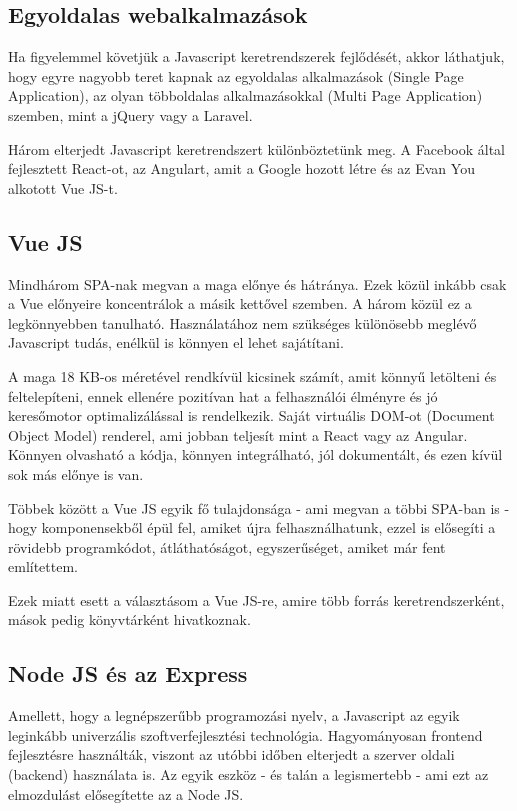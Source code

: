 \subsection{Egyoldalas webalkalmazások}

Ha figyelemmel követjük a Javascript keretrendszerek fejlődését, akkor láthatjuk, hogy egyre nagyobb teret kapnak az egyoldalas alkalmazások (Single Page Application), az olyan többoldalas alkalmazásokkal (Multi Page Application) szemben, mint a jQuery vagy a Laravel.

Három elterjedt Javascript keretrendszert különböztetünk meg. A Facebook által fejlesztett React-ot, az Angulart, amit a Google hozott létre és az Evan You alkotott Vue JS-t.
\cite{vue}

\subsection{Vue JS}

Mindhárom SPA-nak megvan a maga előnye és hátránya. Ezek közül inkább csak a Vue előnyeire koncentrálok a másik kettővel szemben. A három közül ez a legkönnyebben tanulható. Használatához nem szükséges különösebb meglévő Javascript tudás, enélkül is könnyen el lehet sajátítani.

A maga 18 KB-os méretével rendkívül kicsinek számít, amit könnyű letölteni és feltelepíteni, ennek ellenére pozitívan hat a felhasználói élményre és jó keresőmotor optimalizálással is rendelkezik. Saját virtuális DOM-ot (Document Object Model) renderel, ami jobban teljesít mint a React vagy az Angular. Könnyen olvasható a kódja, könnyen integrálható, jól dokumentált, és ezen kívül sok más előnye is van.

Többek között a Vue JS egyik fő tulajdonsága - ami megvan a többi SPA-ban is - hogy komponensekből épül fel, amiket újra felhasználhatunk, ezzel is elősegíti a rövidebb programkódot, átláthatóságot, egyszerűséget, amiket már fent említettem.

Ezek miatt esett a választásom a Vue JS-re, amire több forrás keretrendszerként, mások pedig könyvtárként hivatkoznak.
\cite{vue}

\subsection{Node JS és az Express}

Amellett, hogy a legnépszerűbb programozási nyelv, a Javascript az egyik leginkább univerzális szoftverfejlesztési technológia. Hagyományosan frontend fejlesztésre használták, viszont az utóbbi időben elterjedt a szerver oldali (backend) használata is. Az egyik eszköz - és talán a legismertebb - ami ezt az elmozdulást elősegítette az a Node JS.

